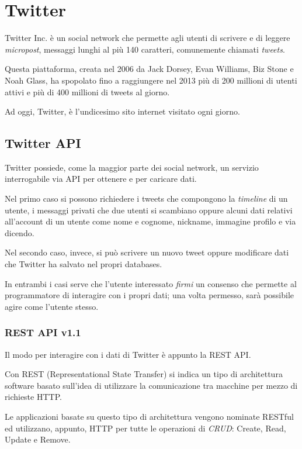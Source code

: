 \chapter{Twitter}
Twitter Inc. è un social network che permette agli utenti di scrivere e di leggere \emph{micropost}, messaggi lunghi al più 140 caratteri, comunemente chiamati \emph{tweets}. 

Questa piattaforma, creata nel 2006 da Jack Dorsey, Evan Williams, Biz Stone e Noah Glass, ha spopolato fino a raggiungere nel 2013 più di 200 millioni di utenti attivi e più di 400 millioni di tweets al giorno\cite{twitter_data}.

Ad oggi, Twitter, è l'undicesimo sito internet visitato ogni giorno\cite{twitter_alexa}.

\section{Twitter API}
	Twitter possiede, come la maggior parte dei social network, un servizio interrogabile via API per ottenere e per caricare dati.

	Nel primo caso si possono richiedere i tweets che compongono la \emph{timeline} di un utente, i messaggi privati che due utenti si scambiano oppure alcuni dati relativi all'account di un utente come nome e cognome, nickname, immagine profilo e via dicendo.

	Nel secondo caso, invece, si può scrivere un nuovo tweet oppure modificare dati che Twitter ha salvato nel propri databases. 

	In entrambi i casi serve che l'utente interessato \emph{firmi} un consenso che permette al programmatore di interagire con i propri dati; una volta permesso, sarà possibile agire come l'utente stesso. 

	\subsection{REST API v1.1}
	Il modo per interagire con i dati di Twitter è appunto la REST API. 
	
	Con REST (Representational State Transfer) si indica un tipo di architettura software basato sull'idea di utilizzare la comunicazione tra macchine per mezzo di richieste HTTP.

	Le applicazioni basate su questo tipo di architettura vengono nominate RESTful ed utilizzano, appunto, HTTP per tutte le operazioni di \emph{CRUD}: Create, Read, Update e Remove.

